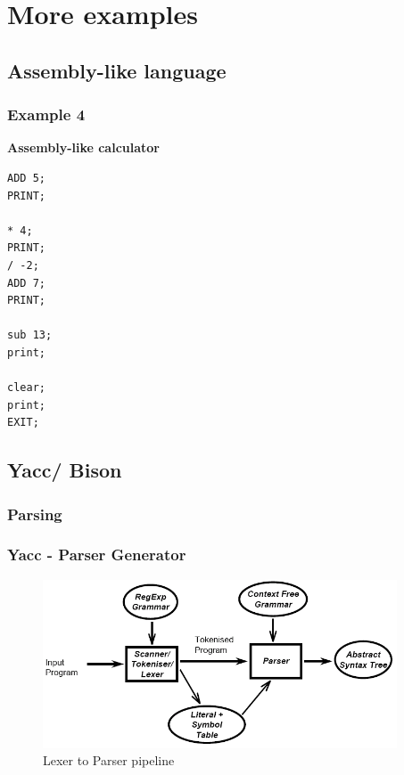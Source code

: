 \documentclass{beamer}
\begin{document}
\section{More examples}

\subsection{Assembly-like language}

\begin{frame}[fragile]
    \frametitle{Example 4}
    
    \textbf{Assembly-like calculator}
    
    \begin{lstlisting}[basicstyle=\small]
ADD 5;
PRINT;

* 4;
PRINT;
/ -2;
ADD 7;
PRINT;

sub 13;
print;

clear;
print;
EXIT;
    \end{lstlisting}
\end{frame}

\subsection{Yacc/ Bison}

\subsubsection{Parsing}

\begin{frame}
    \frametitle{Yacc - Parser Generator}

    \begin{figure}
        \centering
        \includegraphics[height=5cm]{imgs/parsingpipeline.png}
        \caption{Lexer to Parser pipeline}
        \label{fig:parser}
    \end{figure}
\end{frame}
\end{document}
